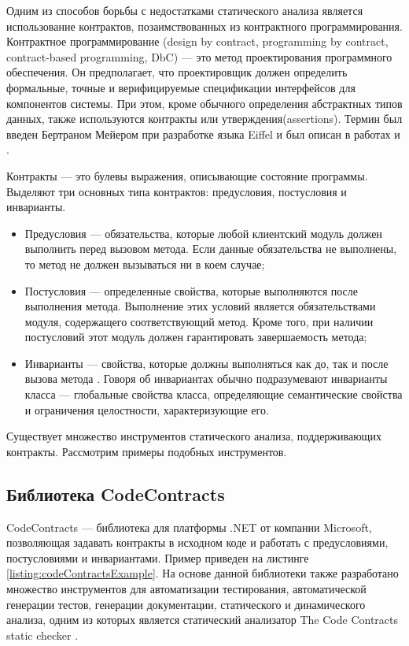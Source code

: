 Одним из способов борьбы с недостатками статического анализа является использование контрактов, позаимствованных из контрактного программирования. Контрактное программирование (design by contract, programming by contract, contract-based programming, DbC) --- это метод проектирования программного обеспечения. Он предполагает, что проектировщик должен определить формальные, точные и верифицируемые спецификации интерфейсов для компонентов системы. При этом, кроме обычного определения абстрактных типов данных, также используются контракты или утверждения(assertions). Термин был введен Бертраном Мейером при разработке языка Eiffel\cite{eiffel} и был описан в работах \cite{designByContract} и \cite{oosc-meyer}.

Контракты --- это булевы выражения, описывающие состояние программы. Выделяют три основных типа контрактов: предусловия, постусловия и инварианты.
\begin{itemize}
\item Предусловия --- обязательства, которые любой клиентский модуль должен выполнить перед вызовом метода. Если данные обязательства не выполнены, то метод не должен вызываться ни в коем случае;

\item Постусловия --- определенные свойства, которые выполняются после выполнения метода. Выполнение этих условий является обязательствами модуля, содержащего соответствующий метод. Кроме того, при наличии постусловий этот модуль должен гарантировать завершаемость метода;

\item Инварианты --- свойства, которые должны выполняться как до, так и после вызова метода . Говоря об инвариантах обычно подразумевают инварианты класса --- глобальные свойства класса, определяющие семантические свойства и ограничения целостности, характеризующие его.
\end{itemize}

Существует множество инструментов статического анализа, поддерживающих контракты. Рассмотрим примеры подобных инструментов.

\subsection{Библиотека CodeContracts}
CodeContracts --- библиотека для платформы .NET от компании Microsoft, позволяющая задавать контракты в исходном коде\cite{codeContracts} и работать с предусловиями, постусловиями и инвариантами. Пример приведен на листинге \ref{listing:codeContractsExample}. На основе данной библиотеки также разработано множество инструментов для автоматизации тестирования, автоматической генерации тестов, генерации документации, статического и динамического анализа, одним из которых является статический анализатор The Code Contracts static checker \cite{cccheck}.



